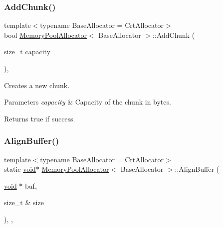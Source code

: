 \subsubsection{\texorpdfstring{Add\+Chunk()}{AddChunk()}}
{\footnotesize\ttfamily template$<$typename Base\+Allocator = Crt\+Allocator$>$ \\
bool \hyperlink{classMemoryPoolAllocator}{Memory\+Pool\+Allocator}$<$ Base\+Allocator $>$\+::Add\+Chunk (\begin{DoxyParamCaption}\item[{size\+\_\+t}]{capacity }\end{DoxyParamCaption})\hspace{0.3cm}{\ttfamily [inline]}, {\ttfamily [private]}}



Creates a new chunk. 


\begin{DoxyParams}{Parameters}
{\em capacity} & Capacity of the chunk in bytes. \\
\hline
\end{DoxyParams}
\begin{DoxyReturn}{Returns}
true if success. 
\end{DoxyReturn}
\mbox{\label{classMemoryPoolAllocator_afced2c61ee261874a3b45d3343f63eb2}} 
\subsubsection{\texorpdfstring{Align\+Buffer()}{AlignBuffer()}}
{\footnotesize\ttfamily template$<$typename Base\+Allocator = Crt\+Allocator$>$ \\
static \hyperlink{imgui__impl__opengl3__loader_8h_ac668e7cffd9e2e9cfee428b9b2f34fa7}{void}$\ast$ \hyperlink{classMemoryPoolAllocator}{Memory\+Pool\+Allocator}$<$ Base\+Allocator $>$\+::Align\+Buffer (\begin{DoxyParamCaption}\item[{\hyperlink{imgui__impl__opengl3__loader_8h_ac668e7cffd9e2e9cfee428b9b2f34fa7}{void} $\ast$}]{buf,  }\item[{size\+\_\+t \&}]{size }\end{DoxyParamCaption})\hspace{0.3cm}{\ttfamily [inline]}, {\ttfamily [static]}, {\ttfamily [private]}}

